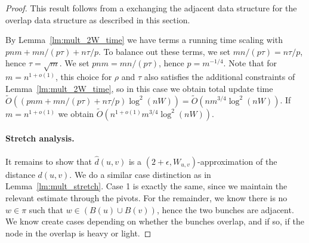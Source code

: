 \thmtwoW*
\begin{proof}
    This result follows from a exchanging the adjacent data structure for the overlap data structure as described in this section. 
    
    By Lemma~\ref{lm:mult_2W_time} we have terms a running time scaling with $pnm+mn/(p\tau)+n\tau/p$. To balance out these terms, we set $mn/(p\tau)=n\tau/p$, hence $\tau=\sqrt{m}$. We set $pnm = mn/(p\tau)$, hence $p=m^{-1/4}$. Note that for $m=n^{1+o(1)}$, this choice for $\rho$ and $\tau$ also satisfies the additional constraints of Lemma~\ref{lm:mult_2W_time}, so in this case we obtain total update time $\tilde O( (pnm+mn/(p\tau)+n\tau/p)\log^2(nW))= \tilde O (nm^{3/4}\log^2(nW))$. If $m=n^{1+o(1)}$ we obtain $\tilde O (n^{1+o(1)}m^{3/4}\log^2(nW))$.
    
    \paragraph{Stretch analysis.} It remains to show that $\hat d(u,v)$ is a $(2+\epsilon,W_{u,v})$-approximation of the distance $d(u,v)$. We do a similar case distinction as in Lemma~\ref{lm:mult_stretch}. Case 1 is exactly the same, since we maintain the relevant estimate through the pivots. For the remainder, we know there is no $w\in \pi$ such that $w\in (B(u)\cup B(v))$, hence the two bunches are adjacent. We know create cases depending on whether the bunches overlap, and if so, if the node in the overlap is heavy or light. 
    

\end{proof}
